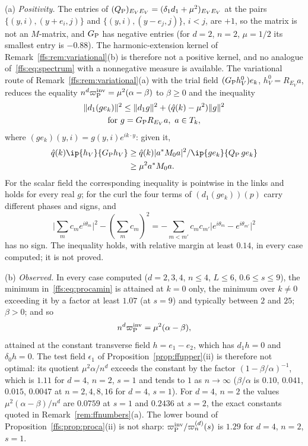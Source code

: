 \begin{remark}\label{ffs:rem:proca}
(a) \emph{Positivity.} The entries of $(Q_{\rm P})_{E_VE_V}=(\delta_1d_1+\mu^2)
_{E_VE_V}$ at the pairs $\{(y,i),(y+e_i,j)\}$ and $\{(y,i),(y-e_j,j)\}$, $i<j$,
are $+1$, so the matrix is not an $M$-matrix, and $G_{\rm P}$ has negative
entries (for $d=2$, $n=2$, $\mu=1/2$ its smallest entry is $-0.88$). The
harmonic-extension kernel of Remark~\ref{ffs:rem:variational}(b) is therefore
not a positive kernel, and no analogue of~\eqref{ffs:eq:spectrum} with a
nonnegative measure is available. The variational route of
Remark~\ref{ffs:rem:variational}(a) with the trial field $(G_{\rm P}h^0_V)e_k$,
$h^0_V=R_{E_V}a$, reduces the equality $n^d\varpi_{\rm P}^{\rm inv}=\mu^2(
\alpha-\beta)$ to $\beta\ge0$ and the inequality
\begin{multline*}
\lVert d_1(ge_k)\rVert^2\le\lVert d_1g\rVert^2+(\hat q(k)-\mu^2)\lVert g\rVert
^2\\
\text{for }g=G_{\rm P}R_{E_V}a,\ a\in T_k,
\end{multline*}
where $(ge_k)(y,i)=g(y,i)e^{ik\cdot y}$: given it,
\begin{align*}
\hat q(k)\ip{h_V}{G_{\rm P}h_V}&\ge\hat q(k)\lvert a^*M_0a\rvert^2/\ip{ge_k}
{Q_{\rm P}\,ge_k}\\
&\ge\mu^2a^*M_0a.
\end{align*}
For the scalar field the corresponding inequality is pointwise in the links
and holds for every real $g$; for the curl the four terms of $(d_1(ge_k))(p)$
carry different phases and signs, and
\[
\lvert\sum_mc_me^{i\theta_m}\rvert^2-
(\sum_mc_m)^2=-\sum_{m<m'}c_mc_{m'}\lvert e^{i\theta_m}-e^{i\theta_{m'}}
\rvert^2
\]
has no sign. The inequality holds, with relative margin at least
$0.14$, in every case computed; it is not proved.

(b) \emph{Observed.} In every case computed ($d=2,3,4$, $n\le4$, $L\le6$,
$0.6\le s\le9$), the minimum in~\eqref{ffs:eq:procamin} is attained at $k=0$
only, the minimum over $k\ne0$ exceeding it by a factor at least $1.07$ (at
$s=9$) and typically between $2$ and $25$; $\beta>0$; and so
\[
n^d\varpi_{\rm P}^{\rm inv}=\mu^2(\alpha-\beta),
\]
attained at the constant transverse field $h=e_1-e_2$, which has $d_1h=0$ and
$\delta_0h=0$. The test field $\epsilon_1$ of Proposition~\ref{prop:ffupper}(ii)
is therefore not optimal: its quotient $\mu^2\alpha/n^d$ exceeds the constant
by the factor $(1-\beta/\alpha)^{-1}$, which is $1.11$ for $d=4$, $n=2$, $s=1$
and tends to $1$ as $n\to\infty$ ($\beta/\alpha$ is $0.10$, $0.041$, $0.015$,
$0.0047$ at $n=2,4,8,16$ for $d=4$, $s=1$). For $d=4$, $n=2$ the values
$\mu^2(\alpha-\beta)/n^d$ are $0.0759$ at $s=1$ and $0.2436$ at $s=2$, the
exact constants quoted in Remark~\ref{rem:ffnumbers}(a). The lower bound of
Proposition~\ref{ffs:prop:proca}(ii) is not sharp: $\varpi_{\rm P}^{\rm inv}/
\varpi_n^{(d)}(s)$ is $1.29$ for $d=4$, $n=2$, $s=1$.


\end{remark}
